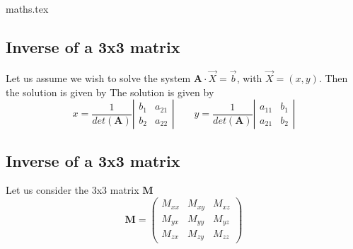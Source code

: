\begin{flushright} {\tiny {\color{gray} maths.tex}} \end{flushright}

\subsection{Inverse of a 3x3 matrix \label{sec:inv2x2}}

Let us assume we wish to solve the 
system $\bm A \cdot \vec X = \vec b$, with $\vec X=(x,y)$. Then the solution is given by
The solution is given by
\[
x=\frac{1}{det(\bm A)}
\left|
\begin{array}{cc}
b_1 & a_{21} \\
b_2 & a_{22}
\end{array}
\right|
\qquad
y=\frac{1}{det(\bm A)}
\left|
\begin{array}{cc}
a_{11} & b_1\\
a_{21} & b_2
\end{array}
\right|
\]



\subsection{Inverse of a 3x3 matrix \label{sec:inv3x3}}

Let us consider the 3x3 matrix ${\bm M}$
\[
{\bm M}=
\left(
\begin{array}{ccc}
M_{xx} & M_{xy} & M_{xz} \\
M_{yx} & M_{yy} & M_{yz} \\
M_{zx} & M_{zy} & M_{zz} 
\end{array}
\right)
\]

